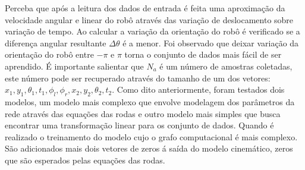 Perceba que após a leitura dos dados de entrada é feita uma aproximação da
velocidade angular e linear do robô através das variação de deslocamento
sobre variação de tempo. Ao calcular a variação da orientação do robô
é verificado se a diferença angular resultante $\Delta \theta$ é a menor.
Foi observado que deixar variação da orientação do robô entre
$-\pi$ e $\pi$ torna o conjunto de dados mais fácil de ser aprendido.  
É importante salientar que $N_a$
é um número de amostras coletadas, este número pode ser recuperado através
do tamanho de um dos vetores: $x_1,y_1,\theta_{1},t_1,\phi_l,\phi_r,x_2,y_2,\theta_{2},t_2$.
Como dito anteriormente, foram testados dois modelos, um modelo mais complexo
que envolve modelagem dos parâmetros da rede através das equações das rodas
e outro modelo mais simples que busca encontrar uma transformação linear
para os conjunto de dados. Quando é realizado o treinamento do modelo
cujo o grafo computacional é mais complexo.
São adicionados mais dois vetores de zeros á saída do modelo cinemático, zeros
que são esperados pelas equações das rodas. 